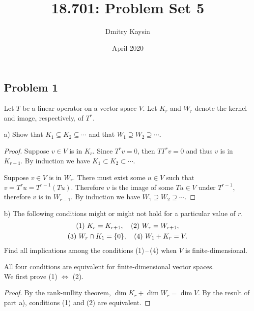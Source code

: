 \documentclass{article}
\title{18.701: Problem Set 5}
\author{Dmitry Kaysin}
\date{April 2020}
\theoremstyle{definition}
\DeclarePairedDelimiter\set{\{}{\}}
\begin{document}
\maketitle 


\subsection*{Problem 1}

\begin{tcolorbox}
Let $T$ be a linear operator on a vector space $V$. Let $K_r$ and $W_r$ denote the kernel and image, respectively, of $T^r$.

a) Show that $K_1 \subseteq K_2 \subseteq \cdots$ and that $W_1 \supseteq W_2 \supseteq \cdots$.
\end{tcolorbox}

\begin{proof}

Suppose $v \in V$ is in $K_r$.
Since $T^r v = 0$, then $TT^r v = 0$ and thus $v$ is in $K_{r+1}$.
By induction we have $K_1 \subset K_2 \subset \cdots$.

Suppose $v \in V$ is in $W_r$.
There must exist some $u \in V$ such that $v = T^r u = T^{r-1} (Tu)$.
Therefore $v$ is the image of some $Tu \in V$ under $T^{r-1}$, therefore $v$ is in $W_{r-1}$.
By induction we have $W_1 \supseteq W_2 \supseteq \cdots$.

\end{proof}

\begin{tcolorbox}
b) The following conditions might or might not hold for a particular value of $r$.
\begin{gather*}
    \text{(1) } K_r = K_{r+1}, \quad 
    \text{(2) } W_r = W_{r+1}, \\
    \text{(3) } W_r \cap K_1 = \set{0}, \quad
    \text{(4) } W_1 + K_r = V.
\end{gather*}
Find all implications among the conditions (1)\,--\,(4) when $V$ is finite-dimensional.
\end{tcolorbox}

All four conditions are equivalent for finite-dimensional vector spaces.
\\

We first prove (1) $\iff$ (2).

\begin{proof}
By the rank-nullity theorem, $\dim K_r + \dim W_r = \dim V$.
By the result of part a), conditions (1) and (2) are equivalent.
\end{proof}
\end{document}
